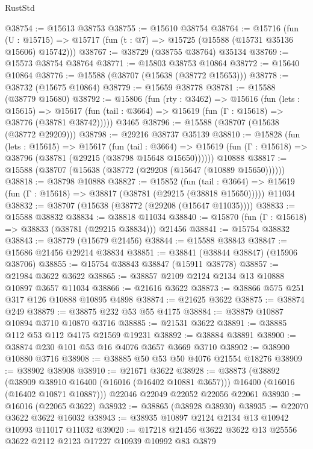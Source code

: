\begin{lexlean}{RustStd}
\begin{coremodule}
@38754 := @15613 @38753
@38755 := @15610 @38754
@38764 := @15716
    (fun (U : @15715) => @15717 (fun (t : @7) => @15725 (@15588 (@15731 @35136 @15606) @15742)))
@38767 := @38729 (@38755 @38764) @35134
@38769 := @15573 @38754 @38764
@38771 := @15803 @38753 @10864
@38772 := @15640 @10864
@38776 := @15588 (@38707 (@15638 (@38772 @15653)))
@38778 := @38732 (@15675 @10864)
@38779 := @15659 @38778
@38781 := @15588 (@38779 @15680)
@38792 := @15806
    (fun (rty : @3462) =>
    @15616
      (fun (lets : @15615) =>
      @15617 (fun (tail : @3664) => @15619 (fun (Γ : @15618) => @38776 (@38781 @38742)))))
    @3465
@38796 := @15588 (@38707 (@15638 (@38772 @29209)))
@38798 := @29216 @38737 @35139
@38810 := @15828
    (fun (lets : @15615) =>
    @15617
      (fun (tail : @3664) =>
      @15619 (fun (Γ : @15618) => @38796 (@38781 (@29215 (@38798 @15648 @15650))))))
    @10888
@38817 := @15588 (@38707 (@15638 (@38772 (@29208 (@15647 (@10889 @15650))))))
@38818 := @38798 @10888
@38827 := @15852
    (fun (tail : @3664) => @15619 (fun (Γ : @15618) => @38817 (@38781 (@29215 (@38818 @15650)))))
    @11034
@38832 := @38707 (@15638 (@38772 (@29208 (@15647 @11035))))
@38833 := @15588 @38832
@38834 := @38818 @11034
@38840 := @15870 (fun (Γ : @15618) => @38833 (@38781 (@29215 @38834))) @21456
@38841 := @15754 @38832
@38843 := @38779 (@15679 @21456)
@38844 := @15588 @38843
@38847 := @15686 @21456 @29214 @38834
@38851 := @38841 (@38844 @38847) (@15906 @38706)
@38855 := @15754 @38843 @38847 (@15911 @38778)
@38857 := @21984 @3622 @3622
@38865 := @38857 @2109 @2124 @2134 @13 @10888 @10897 @3657 @11034
@38866 := @21616 @3622
@38873 := @38866 @575 @251 @317 @126 @10888 @10895 @4898
@38874 := @21625 @3622
@38875 := @38874 @249
@38879 := @38875 @232 @53 @55 @4175
@38884 := @38879 @10887 @10894 @3710 @10870 @3716
@38885 := @21531 @3622
@38891 := @38885 @112 @53 @112 @4175 @21569 @19231
@38892 := @38884 @38891
@38900 := @38874 @230 @101 @53 @16 @4076 @3657 @3669 @3710
@38902 := @38900 @10880 @3716
@38908 := @38885 @50 @53 @50 @4076 @21554 @18276
@38909 := @38902 @38908
@38910 := @21671 @3622
@38928 := @38873
    (@38892
      (@38909 @38910 @16400 (@16016 (@16402 @10881 @3657)))
      @16400
      (@16016 (@16402 @10871 @10887)))
    @22046
    @22049
    @22052
    @22056
    @22061
@38930 := @16016 (@22065 @3622)
@38932 := @38865 (@38928 @38930)
@38935 := @22070 @3622 @3622 @16032
@38943 := @38935 @10897 @2124 @2134 @13 @10942 @10993 @11017 @11032
@39020 := @17218
    @21456
    @3622
    @3622
    @13
    @25556
    @3622
    @2112
    @2123
    @17227
    @10939
    @10992
    @83
    @3879

\end{coremodule}
\end{lexlean}
